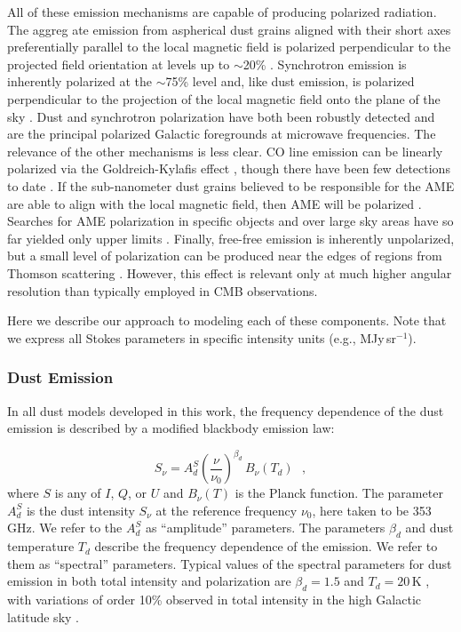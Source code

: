 \documentclass[twocolumn]{aastex631}
\begin{document}
All of these emission mechanisms are capable of producing polarized radiation. The aggreg
ate emission from aspherical dust grains aligned with their short axes preferentially parallel to the local magnetic field is polarized perpendicular to the projected field orientation at levels up to $\sim$20\% \citep{planck2014-XIX}. Synchrotron emission is inherently polarized at the $\sim$75\% level and, like dust emission, is polarized perpendicular to the projection of the local magnetic field onto the plane of the sky \citep{Rybicki:1986}. Dust and synchrotron polarization have both been robustly detected and are the principal polarized Galactic foregrounds at microwave frequencies. The relevance of the other mechanisms is less clear. CO line emission can be linearly polarized via the Goldreich-Kylafis effect \citep{Goldreich:1981}, though there have been few detections to date \citep[e.g.,][]{Greaves:1999, Greaves:2002, Cortes:2008, Houde:2013}. If the sub-nanometer dust grains believed to be responsible for the AME are able to align with the local magnetic field, then AME will be polarized \citep{Draine:1998a}. Searches for AME polarization in specific objects and over large sky areas have so far yielded only upper limits \citep[e.g.,][]{Genova-Santos:2017, Herman:2023}. Finally, free-free emission is inherently unpolarized, but a small level of polarization can be produced near the edges of  regions from Thomson scattering \citep{Rybicki:1986}. However, this effect is relevant only at much higher angular resolution than typically employed in CMB observations.

Here we describe our approach to modeling each of these components. Note that we express all Stokes parameters in specific intensity units (e.g., MJy\,sr$^{-1}$).

\subsubsection{Dust Emission} \label{subsubsec:dust_model}
In all dust models developed in this work, the frequency dependence of the dust emission is described by a modified blackbody emission law:

\begin{equation} \label{eq:dust-emission-law}
    S_\nu = A_d^S \left(\frac{\nu}{\nu_0}\right)^{\beta_d} \, B_\nu(T_d)
    ~~~,
\end{equation}
where $S$ is any of $I$, $Q$, or $U$ and $B_\nu\left(T\right)$ is the Planck function. The parameter $A_d^S$ is the dust intensity $S_\nu$ at the reference frequency $\nu_0$, here taken to be 353\,GHz. We refer to the $A_d^S$ as ``amplitude'' parameters. The parameters $\beta_d$ and dust temperature $T_d$ describe the frequency dependence of the emission. We refer to them as ``spectral'' parameters. Typical values of the spectral parameters for dust emission in both total intensity and polarization are $\beta_d = 1.5$ and $T_d = 20$\,K \citep{planck2016-l11A}, with variations of order 10\% observed in total intensity in the high Galactic latitude sky \citep[e.g.,][]{planck2014-a12, planck2016-XLVIII}.
\end{document}
